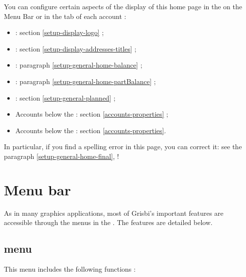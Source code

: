 You can configure certain aspects of the display of this home page in the  on the Menu Bar or in the  tab of each account :
\begin{itemize}
	 \item {} : section \vref{setup-display-logo} ;
	 \item {} : section \vref{setup-display-addresses-titles} ;
	 \item {} : paragraph \vref{setup-general-home-balance} ;
	 \item {} : paragraph \vref{setup-general-home-partBalance} ;
	 \item {} : section \vref{setup-general-planned} ;
	 \item Accounts below the  : section \vref{accounts-properties} ;
	 \item Accounts below the  : section  \vref{accounts-properties}.
\end{itemize}

In particular, if you find a spelling error in this page, you can correct it: see the paragraph \vref{setup-general-home-final},  !

\ifIllustration
\newpage
\fi

\section{Menu bar\label{home-menus}}

As in many graphics applications, most of Grisbi's important features are accessible through the menus in the . The features are detailed below.


\subsection{ menu\label{home-menus-file}}

This menu includes the following functions :

